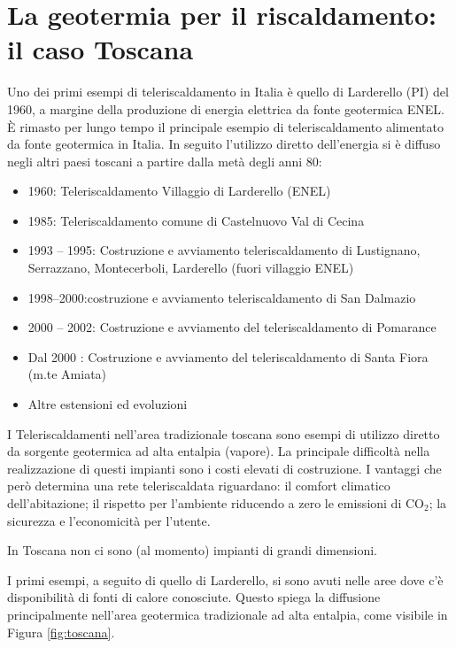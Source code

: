 \documentclass[laurea,oneside,11pt]{USiena_tesiLM3}
\begin{document}
\section{La geotermia per il riscaldamento: il caso Toscana}
Uno dei primi esempi di teleriscaldamento in Italia è quello di Larderello (PI) del 1960, a margine della produzione di energia elettrica da fonte geotermica ENEL. È rimasto per lungo tempo il principale esempio di teleriscaldamento alimentato da fonte geotermica in Italia.
In seguito l'utilizzo diretto dell'energia si è diffuso negli altri paesi toscani a partire dalla metà degli anni 80: 
\begin{itemize}
\item 1960: Teleriscaldamento Villaggio di Larderello
(ENEL)
\item 1985: Teleriscaldamento comune di Castelnuovo Val di Cecina
\item 1993 – 1995: Costruzione e avviamento teleriscaldamento di Lustignano, Serrazzano, Montecerboli, Larderello (fuori villaggio ENEL)
\item 1998–2000:costruzione e avviamento teleriscaldamento di San Dalmazio
\item 2000 – 2002: Costruzione e avviamento del teleriscaldamento di Pomarance
\item Dal 2000 : Costruzione e avviamento del teleriscaldamento di Santa Fiora (m.te Amiata)
\item Altre estensioni ed evoluzioni
\end{itemize}

I Teleriscaldamenti nell'area tradizionale toscana sono esempi di utilizzo diretto da sorgente geotermica ad alta entalpia (vapore). La principale difficoltà nella realizzazione di questi impianti sono i costi elevati di costruzione. I vantaggi che però determina una rete teleriscaldata riguardano: il comfort climatico dell'abitazione; il rispetto per l'ambiente riducendo a zero le emissioni di CO$_2$; la sicurezza e l'economicità per l'utente. 

In Toscana non ci sono (al momento) impianti di grandi dimensioni.

I primi esempi, a seguito di quello di Larderello, si sono avuti nelle aree dove c'è disponibilità di fonti di calore conosciute.
Questo spiega la diffusione principalmente nell'area geotermica tradizionale ad alta entalpia, come visibile in Figura \ref{fig:toscana}.
\end{document}
